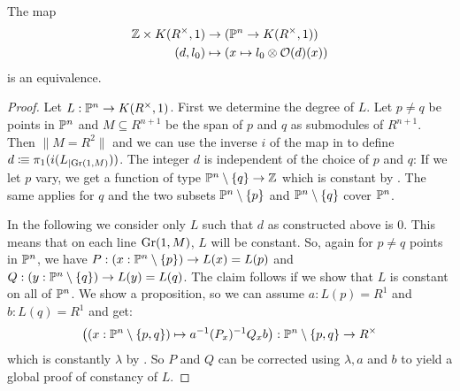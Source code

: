 \begin{theorem}
  The map
  \begin{align*}
    \mathbb{Z}\times K(R^{\times},1) &\to (\mathbb{P}^n\to K(R^{\times},1)) \\
    (d,l_0) &\mapsto (x\mapsto l_0\otimes \mathcal{O}(d)(x))
  \end{align*}
  is an equivalence.
\end{theorem}

\begin{proof}
  Let $L:\mathbb{P}^n\to K(R^{\times},1)$. First we determine the degree of $L$.
  Let $p\neq q$ be points in $\mathbb{P}^n$ and $M\subseteq R^{n+1}$ be the span of $p$ and $q$ as submodules of $R^{n+1}$.
  Then $\|M=R^2\|$ and we can use the inverse $i$ of the map in  to define $d\vcentcolon\mspace{-1.2mu}\equiv \pi_1(i(L_{|\mathrm{Gr}(1,M)}))$.
  The integer $d$ is independent of the choice of $p$ and $q$:
  If we let $p$ vary, we get a function of type $\mathbb{P}^n\setminus\{q\}\to \mathbb{Z}$ which is constant by .
  The same applies for $q$
  and the two subsets $\mathbb{P}^n\setminus\{p\}$ and $\mathbb{P}^n\setminus\{q\}$ cover $\mathbb{P}^n$.

  In the following we consider only $L$ such that $d$ as constructed above is $0$.
  This means that on each line $\mathrm{Gr}(1,M)$, $L$ will be constant.
  So, again for $p\neq q$ points in $\mathbb{P}^n$,
  we have $P:(x:\mathbb{P}^n\setminus\{p\})\to L(x)=L(p)$ and $Q:(y:\mathbb{P}^n\setminus\{q\})\to L(y)=L(q)$.
  The claim follows if we show that $L$ is constant on all of $\mathbb{P}^n$.
  We show a proposition, so we can assume $a:L(p)=R^1$ and $b:L(q)=R^1$ and get:
  \[ \left((x:\mathbb{P}^n\setminus\{p,q\})\mapsto a^{-1}(P_x)^{-1}Q_xb\right) : \mathbb{P}^n\setminus\{p,q\} \to R^\times\]
  which is constantly $\lambda$ by .
  So $P$ and $Q$ can be corrected using $\lambda,a$ and $b$ to yield a global proof of constancy of $L$.
\end{proof}
